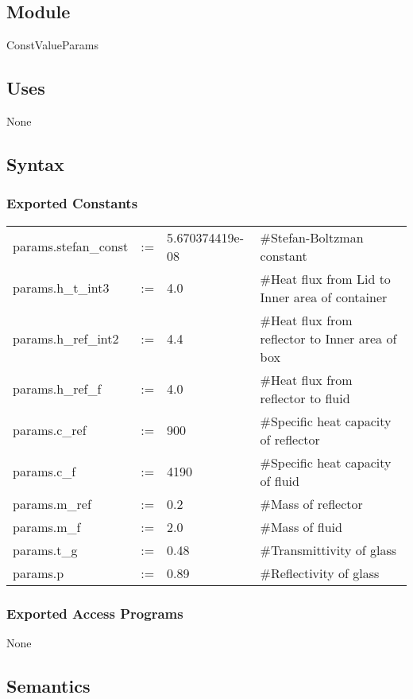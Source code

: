 \documentclass[12pt, titlepage]{article}
\begin{document}
\subsection{Module}

ConstValueParams

\subsection{Uses}
None

\subsection{Syntax}

\subsubsection{Exported Constants}
\begin{center}
\begin{tabular}{p{3.3cm} p{0.2cm} p{3cm} p{7cm}}
params.stefan\_const & := & 5.670374419e-08 & \#Stefan-Boltzman constant\\
params.h\_t\_int3 & := & 4.0 & \#Heat flux from Lid to Inner area of container\\
params.h\_ref\_int2 & := & 4.4 & \#Heat flux from reflector to Inner area of box \\ 
params.h\_ref\_f & := & 4.0 & \#Heat flux from reflector to fluid \\
params.c\_ref & := & 900 & \#Specific heat capacity of reflector \\
params.c\_f & := & 4190 & \#Specific heat capacity of fluid \\
params.m\_ref & := & 0.2 & \#Mass of reflector \\
params.m\_f & := & 2.0 & \#Mass of fluid \\
params.t\_g & := & 0.48 & \#Transmittivity of glass \\ 
params.p & := & 0.89 & \#Reflectivity of glass \\ 
\end{tabular}
\end{center}

\subsubsection{Exported Access Programs}

None

\subsection{Semantics}
\end{document}
